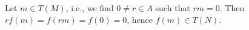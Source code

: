 Let $m \in T(M)$, i.e., we find $0\neq r \in A$ such that $rm = 0$. Then
$rf(m) = f(rm) = f(0) = 0$, hence $f(m) \in T(N)$.

